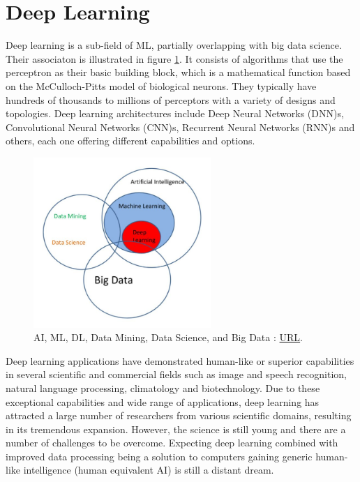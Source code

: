 \section{Deep Learning}
Deep learning is a sub-field of ML, partially overlapping with big data science. Their associaton is illustrated in figure \ref{fig:AI Venn Diagram}. It consists of algorithms that use the perceptron as their basic building block, which is a mathematical function based on the McCulloch-Pitts model of biological neurons. They typically have hundreds of thousands to millions of perceptors with a variety of designs and topologies. Deep learning architectures include Deep Neural Networks (DNN)s, Convolutional Neural Networks (CNN)s, Recurrent Neural Networks (RNN)s and others, each one offering different capabilities and options.
\begin{figure}[H]
    \centering
        \includegraphics[width=0.6\textwidth]{Images/diagrams/ai_data_science.jpg}
        \decoRule
        \caption[AI Venn Diagram]{AI, ML, DL, Data Mining, Data Science, and Big Data \cite{AI_ven_diagram}: \href{https://whatsthebigdata.com/2016/10/17/visually-linking-ai-machine-learning-deep-learning-big-data-and-data-science/}{URL}.}
        \label{fig:AI Venn Diagram}
\end{figure}

Deep learning applications have demonstrated human-like or superior capabilities in several scientific and commercial fields such as image\cite{Alexnet} and speech\cite{limits_speech_recognition} recognition, natural language processing\cite{natural_language}, climatology\cite{Climatology} and biotechnology\cite{biotechnology}. Due to these exceptional capabilities and wide range of applications, deep learning has attracted a large number of researchers from various scientific domains, resulting in its tremendous expansion. However, the science is still young and there are a number of challenges to be overcome. Expecting deep learning combined with improved data processing being a solution to computers gaining generic human-like intelligence (human equivalent AI) is still a distant dream.\cite{dl_evolution}

